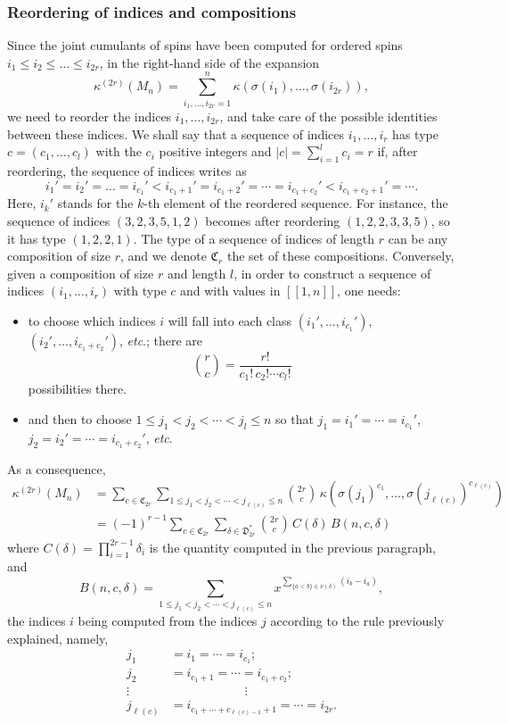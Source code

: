 \documentclass[12pt,a4paper,reqno]{amsart}
\newcommand{\cym}{\mathfrak{C}}
\newcommand{\dym}{\mathfrak{D}}
\newcommand{\lle}{\left[\!\left[}
\newcommand{\rre}{\right]\!\right]}
\theoremstyle{remark}
\begin{document}
\subsubsection{Reordering of indices and compositions} Since the joint cumulants of spins have been computed for ordered spins $i_1\leq i_2\leq\ldots\leq i_{2r}$, in the right-hand side of the expansion
 $$\kappa^{(2r)}(M_n)=\sum_{i_1,\ldots,i_{2r}=1}^n\kappa(\sigma(i_1),\ldots,\sigma(i_{2r})),$$
we need to reorder the indices $i_1,\ldots,i_{2r}$, and take care of the possible identities between these indices. We shall say that a sequence of indices $i_1,\ldots,i_{r}$ has type $c=(c_1,\ldots,c_l)$ with the $c_i$ positive integers and $|c|=\sum_{i=1}^l c_i = r$ if, after reordering, the sequence of indices writes as
$$i_1'=i_2'=\ldots=i_{c_1}'<i_{c_1+1}'=i_{c_1+2}'=\cdots = i_{c_1+c_2}'<i_{c_1+c_2+1}' = \cdots.$$
Here, $i_k'$ stands for the $k$-th element of the reordered sequence. For instance, the sequence of indices $(3,2,3,5,1,2)$ becomes after reordering $(1,2,2,3,3,5)$, so it has type $(1,2,2,1)$. The type of a sequence of indices of length $r$ can be any composition of size $r$, and we denote $\cym_{r}$ the set of these compositions. Conversely, given a composition of size $r$ and length $l$, in order to construct a sequence of indices $(i_1,\ldots,i_r)$ with type $c$ and with values in $\lle 1,n\rre$, one needs:\vspace{1mm}
\begin{itemize}
\item  to choose which indices $i$ will fall into each class $(i_1',\ldots,i_{c_1}')$, $(i_2',\ldots,i_{c_1+c_2}')$, \emph{etc}.; there are
$$\binom{r}{c}=\frac{r!}{c_1!\,c_2!\cdots c_l!}$$
possibilities there.
\vspace{1mm}
\item and then to choose $1\leq j_1<j_2<\cdots <j_l \leq n$ so that $j_1=i_1'=\cdots=i_{c_1}'$, $j_2=i_2'=\cdots=i_{c_1+c_2}'$, \emph{etc}.\vspace{1mm}
\end{itemize}
As a consequence,
\begin{align*}\kappa^{(2r)}(M_n)&=\sum_{c \in \cym_{2r}} \sum_{1\leq j_1<j_2<\cdots <j_{\ell(c)} \leq n} \binom{2r}{c}\, \kappa\left(\sigma(j_1)^{c_1},\ldots,\sigma(j_{\ell(c)})^{c_{\ell(c)}}\right)\\
&=(-1)^{r-1}\sum_{c\in \cym_{2r}}\sum_{\delta \in \dym_{2r}^*}  \binom{2r}{c}\, C(\delta)\,B(n,c,\delta)
\end{align*}
where $C(\delta)=\prod_{i=1}^{2r-1} \delta_i$ is the quantity computed in the previous paragraph, and 
$$B(n,c,\delta)=\sum_{1\leq j_1<j_2<\cdots <j_{\ell(c)} \leq n} x^{\sum_{\{a<b\}\in \nu(\delta)} (i_b-i_a)},$$
the indices $i$ being computed from the indices $j$ according to the rule previously explained, namely,
\begin{align*}
j_1&=i_1=\cdots=i_{c_1};\\
j_2&=i_{c_1+1}=\cdots=i_{c_1+c_2};\\
\vdots & \qquad\qquad \qquad \vdots\\
j_{\ell(c)}&=i_{c_1+\cdots+c_{\ell(c)-1}+1}=\cdots=i_{2r}.
\end{align*}
\end{document}
